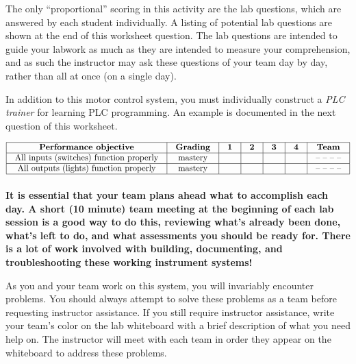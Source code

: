 The only ``proportional'' scoring in this activity are the lab questions, which are answered by each student individually.  A listing of potential lab questions are shown at the end of this worksheet question.  The lab questions are intended to guide your labwork as much as they are intended to measure your comprehension, and as such the instructor may ask these questions of your team day by day, rather than all at once (on a single day).

\vskip 10pt

In addition to this motor control system, you must individually construct a {\it PLC trainer} for learning PLC programming.  An example is documented in the next question of this worksheet.



$$\vbox{\offinterlineskip
\halign{\strut
\vrule \quad\hfil # \ \hfil & 
\vrule \quad\hfil # \ \hfil & 
\vrule \quad\hfil # \ \hfil & 
\vrule \quad\hfil # \ \hfil & 
\vrule \quad\hfil # \ \hfil & 
\vrule \quad\hfil # \ \hfil & 
\vrule \quad\hfil # \ \hfil \vrule \cr
\noalign{\hrule}
%
{\bf Performance objective} & {\bf Grading} & {\bf 1} & {\bf 2} & {\bf 3} & {\bf 4} & {\bf Team} \cr
%
\noalign{\hrule}
%
All inputs (switches) function properly & mastery & & & & & -- -- -- -- \cr
%
\noalign{\hrule}
%
All outputs (lights) function properly & mastery & & & & & -- -- -- -- \cr
%
\noalign{\hrule}
} %
}$$ %

\vskip 10pt

{\bf It is essential that your team plans ahead what to accomplish each day.  A short (10 minute) team meeting at the beginning of each lab session is a good way to do this, reviewing what's already been done, what's left to do, and what assessments you should be ready for.  There is a lot of work involved with building, documenting, and troubleshooting these working instrument systems!}

As you and your team work on this system, you will invariably encounter problems.  You should always attempt to solve these problems as a team before requesting instructor assistance.  If you still require instructor assistance, write your team's color on the lab whiteboard with a brief description of what you need help on.  The instructor will meet with each team in order they appear on the whiteboard to address these problems.




